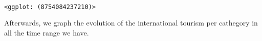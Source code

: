 \documentclass[11pt]{article}
\makeatletter
\newcommand{\boxspacing}{\kern\kvtcb@left@rule\kern\kvtcb@boxsep}
\newcommand{\prompt}[4]{
        {\ttfamily\llap{{\color{#2}[#3]:\hspace{3pt}#4}}\vspace{-\baselineskip}}
    }
\makeatother
\begin{document}
    \begin{center}
    \end{center}
    { \hspace*{\fill} \\}
    
            \begin{tcolorbox}[breakable, size=fbox, boxrule=.5pt, pad at break*=1mm, opacityfill=0]
\prompt{Out}{outcolor}{14}{\boxspacing}
\begin{Verbatim}[commandchars=\\\{\}]
<ggplot: (8754084237210)>
\end{Verbatim}
\end{tcolorbox}
        
    Afterwards, we graph the evolution of the international tourism per
cathegory in all the time range we have.
\end{document}
